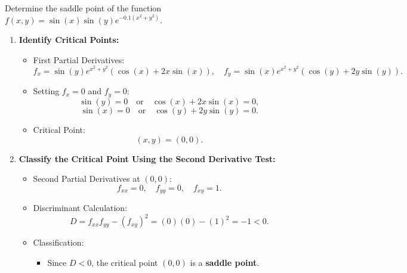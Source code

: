 \exampleline
\begin{example} Determine the saddle point of the function \( f(x,y) = \sin(x)\sin(y)e^{-0.1(x^2 + y^2)} \).
    
  \begin{solution}
    \begin{enumerate}
        \item \textbf{Identify Critical Points:}
        
        \begin{itemize}
            \item First Partial Derivatives:
            \[
            f_x = \sin(y)e^{x^2 + y^2}(\cos(x) + 2x\sin(x)), \quad 
            f_y = \sin(x)e^{x^2 + y^2}(\cos(y) + 2y\sin(y)).
            \]
            
            \item Setting \( f_x = 0 \) and \( f_y = 0 \):
            \[
            \sin(y) = 0 \quad \text{or} \quad \cos(x) + 2x\sin(x) = 0,
            \]
            \[
            \sin(x) = 0 \quad \text{or} \quad \cos(y) + 2y\sin(y) = 0.
            \]
            
            \item Critical Point:
            \[
            (x, y) = (0, 0).
            \]
        \end{itemize}
        
        \item \textbf{Classify the Critical Point Using the Second Derivative Test:}
        
        \begin{itemize}
            \item Second Partial Derivatives at \( (0,0) \):
            \[
            f_{xx} = 0, \quad f_{yy} = 0, \quad f_{xy} = 1.
            \]
            
            \item Discriminant Calculation:
            \[
            D = f_{xx}f_{yy} - (f_{xy})^2 = (0)(0) - (1)^2 = -1 < 0.
            \]
            
            \item Classification:
            \begin{itemize}
                \item Since \( D < 0 \), the critical point \( (0, 0) \) is a \textbf{saddle point}.
            \end{itemize}
        \end{itemize}
    \end{enumerate}
  
\end{solution}
\end{example}
\exampleline


